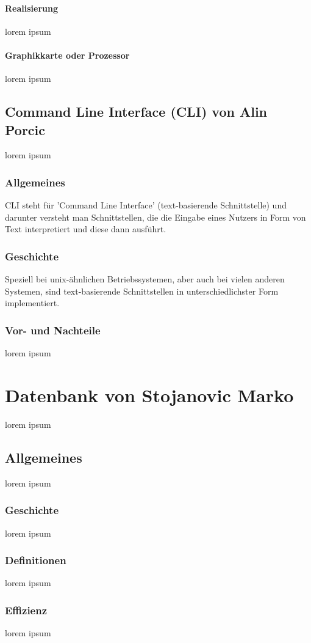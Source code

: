 \documentclass[12pt,a4paper]{report}
\begin{document}
\subsubsection{Realisierung}
lorem ipsum
\subsubsection{Graphikkarte oder Prozessor}
lorem ipsum
\section{Command Line Interface (CLI) von Alin Porcic}
lorem ipsum
\subsection{Allgemeines}

CLI steht für 'Command Line Interface' (text-basierende Schnittstelle) und darunter versteht man Schnittstellen, die die Eingabe eines Nutzers in Form von Text interpretiert und diese dann ausführt.

\subsection{Geschichte}

Speziell bei unix-ähnlichen Betriebssystemen, aber auch bei vielen anderen Systemen, sind text-basierende Schnittstellen in unterschiedlichster Form implementiert.

\subsection{Vor- und Nachteile}
lorem ipsum
\chapter{Datenbank von Stojanovic Marko}
lorem ipsum
\section{Allgemeines}
lorem ipsum
\subsection{Geschichte}
lorem ipsum
\subsection{Definitionen}
lorem ipsum
\subsection{Effizienz}
lorem ipsum
\end{document}
